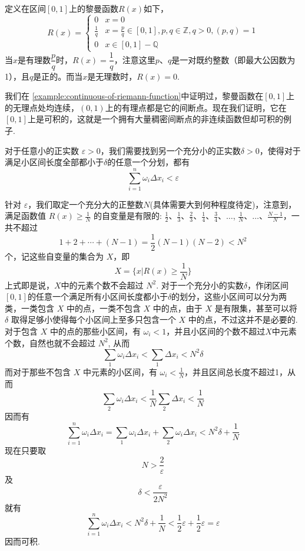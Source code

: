 \begin{example}
    定义在区间$[0,1]$上的黎曼函数$R(x)$如下，
  \[ R(x) =
    \begin{cases}
      0 & x=0 \\
      \frac{1}{q} & x=\frac{p}{q} \in [0,1], p,q \in \mathbb{Z}, q >0, (p,q)=1 \\
      0 & x \in [0,1]-\mathbb{Q}
    \end{cases}
  \]
  当$x$是有理数$\dfrac{p}{q}$时，$R(x)=\dfrac{1}{q}$，注意这里$p$、$q$是一对既约整数（即最大公因数为1），且$q$是正的。而当$x$是无理数时，$R(x)=0$.

  我们在 \autoref{example:continuous-of-riemann-function}中证明过，黎曼函数在$[0,1]$上的无理点处均连续，$(0,1)$上的有理点都是它的间断点。现在我们证明，它在$[0,1]$上是可积的，这就是一个拥有大量稠密间断点的非连续函数但却可积的例子.

  对于任意小的正实数 $\varepsilon>0$，我们需要找到另一个充分小的正实数$\delta>0$，使得对于满足小区间长度全部都小于$\delta$的任意一个分划，都有
  \[ \sum_{i=1}^n\omega_i\Delta x_i<\varepsilon \]

  针对 $\varepsilon$，我们取定一个充分大的正整数$N$(具体需要大到何种程度待定)，注意到，满足函数值 $R(x) \geqslant \frac{1}{N}$ 的自变量是有限的: $\frac{1}{2}$、$\frac{1}{3}$、$\frac{2}{3}$、$\frac{1}{4}$、$\frac{3}{4}$、$\ldots$, $\frac{1}{N}$、$\ldots$、$\frac{N-1}{N}$，一共不超过
  \[ 1+2+\cdots+(N-1) = \frac{1}{2}(N-1)(N-2)<N^2 \]
  个，记这些自变量的集合为 $X$，即
  \[ X=\{x|R(x) \geqslant \frac{1}{N}\} \]
  上式即是说，$X$中的元素个数不会超过 $N^{2}$.
  对于一个充分小的实数$\delta$，作闭区间$[0,1]$的任意一个满足所有小区间长度都小于$\delta$的划分，这些小区间可以分为两类，一类包含 $X$ 中的点，一类不包含 $X$ 中的点，由于 $X$ 是有限集，甚至可以将 $\delta$ 取得足够小使得每个小区间上至多只包含一个 $X$ 中的点，不过这并不是必要的. 对于包含 $X$ 中的点的那些小区间，有 $\omega_i<1$，并且小区间的个数不超过$X$中元素个数，自然也就不会超过 $N^2$, 从而
  \[ \sum_1 \omega_i \Delta x_i < \sum_1 \Delta x_i < N^2\delta \]
  而对于那些不包含 $X$ 中元素的小区间，有 $\omega_i<\frac{1}{N}$，并且区间总长度不超过1，从而
  \[ \sum_2 \omega_i \Delta x_i < \frac{1}{N}\sum_2 \Delta x_i < \frac{1}{N} \]
  因而有
  \[ \sum_{i=1}^n \omega_i \Delta x_i = \sum_1 \omega_i \Delta x_i + \sum_2 \omega_i \Delta x_i < N^2\delta + \frac{1}{N} \]
  现在只要取
  \[ N>\frac{2}{\varepsilon} \]
  及
  \[ \delta < \frac{\varepsilon}{2N^2} \]
  就有
  \[ \sum_{i=1}^n \omega_i \Delta x_i < N^2\delta + \frac{1}{N} < \frac{1}{2}\varepsilon + \frac{1}{2}\varepsilon = \varepsilon \]
因而可积.
\end{example}

